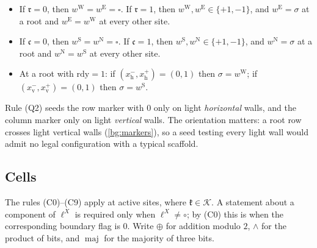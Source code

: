 \begin{itemize}
\item[(P1)] If $\mathfrak r=0$, then $w^{\mathrm W}=w^{\mathrm E}=\square$. If $\mathfrak r=1$, then $w^{\mathrm W},w^{\mathrm E}\in\{+1,-1\}$, and $w^{\mathrm E}=\sigma$ at a root and $w^{\mathrm E}=w^{\mathrm W}$ at every other site.
\item[(P2)] If $\mathfrak c=0$, then $w^{\mathrm S}=w^{\mathrm N}=\square$. If $\mathfrak c=1$, then $w^{\mathrm S},w^{\mathrm N}\in\{+1,-1\}$, and $w^{\mathrm N}=\sigma$ at a root and $w^{\mathrm N}=w^{\mathrm S}$ at every other site.
\item[(P3)] At a root with $\mathrm{rdy}=1$: if $(x^-_{\mathrm h},x^+_{\mathrm h})=(0,1)$ then $\sigma=w^{\mathrm W}$; if $(x^-_{\mathrm v},x^+_{\mathrm v})=(0,1)$ then $\sigma=w^{\mathrm S}$.
\end{itemize}

Rule (Q2) seeds the row marker with $0$ only on light \emph{horizontal} walls, and the column marker only on light \emph{vertical} walls. The orientation matters: a root row crosses light vertical walls (\cref{bg:markers}), so a seed testing every light wall would admit no legal configuration with a typical scaffold.

\subsection{Cells}\label{int:sub-cells}

The rules (C0)--(C9) apply at active sites, where $\mathfrak k\in\mathcal K$. A statement about a component of $\ell^X$ is required only when $\ell^X\ne\circ$; by (C0) this is when the corresponding boundary flag is $0$. Write $\oplus$ for addition modulo $2$, $\wedge$ for the product of bits, and $\operatorname{maj}$ for the majority of three bits.

